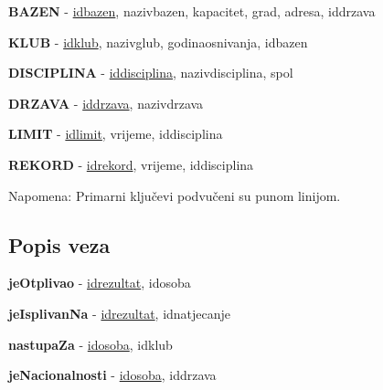 \documentclass[times, utf8, zavrsni]{fer}
\begin{document}
\vspace{\baselineskip}

\textbf{BAZEN} - \underline{idbazen}, nazivbazen, kapacitet, grad, adresa, iddrzava

\vspace{\baselineskip}

\textbf{KLUB} - \underline{idklub}, nazivglub, godinaosnivanja, idbazen

\vspace{\baselineskip}

\textbf{DISCIPLINA} - \underline{iddisciplina}, nazivdisciplina, spol

\vspace{\baselineskip}

\textbf{DRZAVA} - \underline{iddrzava}, nazivdrzava

\vspace{\baselineskip}

\textbf{LIMIT} - \underline{idlimit}, vrijeme, iddisciplina

\vspace{\baselineskip}

\textbf{REKORD} - \underline{idrekord}, vrijeme, iddisciplina

\vspace{\baselineskip}

Napomena: Primarni ključevi podvučeni su punom linijom.

\subsection{Popis veza}

\vspace{\baselineskip}

\textbf{jeOtplivao} - \underline{idrezultat}, idosoba

\vspace{\baselineskip}

\textbf{jeIsplivanNa} - \underline{idrezultat}, idnatjecanje

\vspace{\baselineskip}

\textbf{nastupaZa} - \underline{idosoba}, idklub

\vspace{\baselineskip}

\textbf{jeNacionalnosti} - \underline{idosoba}, iddrzava

\vspace{\baselineskip}
\end{document}
